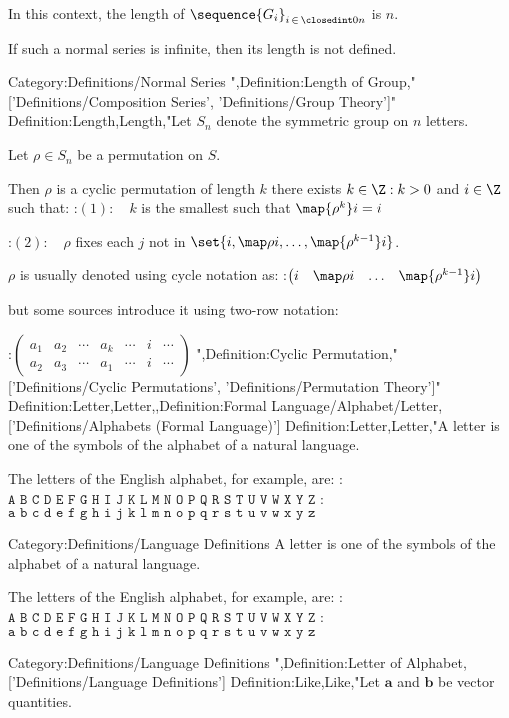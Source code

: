 In this context, the length of $\sequence {G_i}_{i \mathop \in \closedint 0 n}$ is $n$.


If such a normal series is infinite, then its length is not defined.


Category:Definitions/Normal Series
",Definition:Length of Group,"['Definitions/Composition Series', 'Definitions/Group Theory']"
Definition:Length,Length,"Let $S_n$ denote the symmetric group on $n$ letters.

Let $\rho \in S_n$ be a permutation on $S$.


Then $\rho$ is a cyclic permutation of length $k$  there exists $k \in \Z: k > 0$ and $i \in \Z$ such that:
:$(1): \quad k$ is the smallest such that $\map {\rho^k} i = i$

:$(2): \quad \rho$ fixes each $j$ not in $\set {i, \map \rho i, \ldots, \map {\rho^{k - 1} } i}$.


$\rho$ is usually denoted using cycle notation as:
:$\begin{pmatrix} i & \map \rho i & \ldots & \map {\rho^{k - 1} } i \end{pmatrix}$

but some sources introduce it using two-row notation:

:$\begin{pmatrix} a_1 & a_2 & \cdots & a_k & \cdots & i & \cdots \\ a_2 & a_3 & \cdots & a_1 & \cdots & i & \cdots \end{pmatrix}$
",Definition:Cyclic Permutation,"['Definitions/Cyclic Permutations', 'Definitions/Permutation Theory']"
Definition:Letter,Letter,,Definition:Formal Language/Alphabet/Letter,['Definitions/Alphabets (Formal Language)']
Definition:Letter,Letter,"A letter is one of the symbols of the alphabet of a natural language.

The letters of the English alphabet, for example, are:
:$\texttt {A B C D E F G H I J K L M N O P Q R S T U V W X Y Z}$
:$\texttt {a b c d e f g h i j k l m n o p q r s t u v w x y z}$


Category:Definitions/Language Definitions
A letter is one of the symbols of the alphabet of a natural language.

The letters of the English alphabet, for example, are:
:$\texttt {A B C D E F G H I J K L M N O P Q R S T U V W X Y Z}$
:$\texttt {a b c d e f g h i j k l m n o p q r s t u v w x y z}$


Category:Definitions/Language Definitions
",Definition:Letter of Alphabet,['Definitions/Language Definitions']
Definition:Like,Like,"Let $\mathbf a$ and $\mathbf b$ be vector quantities.

